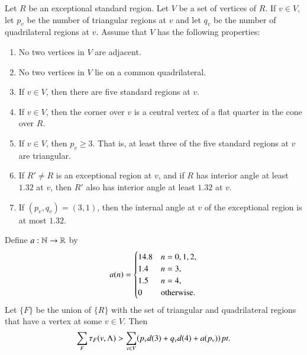 \begin{lemma}\label{lemma:excess-1}
Let $R$ be an exceptional standard region.  Let $V$
be a set of vertices of $R$.  If $v\in V$, let $p_v$ be the number
of triangular regions at $v$ and let $q_v$ be the number of
quadrilateral regions at $v$.  Assume that $V$ has the following
properties:
    \begin{enumerate}
        \item No two
        vertices in $V$ are adjacent.
        \item No two vertices
        in $V$ lie on a common quadrilateral.
        \item If $v\in V$, then there are five standard regions at
        $v$.
        \item If $v\in V$, then the corner over $v$ is a central
        vertex of a flat quarter in the cone over $R$.
        \item If $v\in V$, then $p_v\ge 3$.  That is, at least
        three of the five standard regions at $v$ are triangular.
        \item If $R'\ne R$ is an exceptional region at $v$, and if $R$
        has interior angle at least $1.32$ at $v$, then $R'$ also has interior
        angle at least $1.32$ at $v$.
        \item If $(p_v,q_v)=(3,1)$, then the internal angle at $v$ of the exceptional
        region is at most $1.32$.
    \end{enumerate}
  Define $a:{\mathbb N}\to {\mathbb R}$ by
  $$a(n) = \begin{cases}
    14.8 &n=0,1,2,\\
    1.4 & n=3,\\
    1.5 & n=4,\\
    0 & \text{otherwise.}
  \end{cases}
  \index{aZ@$a(n)$}
  $$
Let $\{F\}$ be the union of $\{R\}$ with the set of triangular and
quadrilateral regions that have a vertex at some $v\in V$. Then
    $$\sum_F\tau_F(v,\Lambda) > \sum_{v\in V} (p_v d(3) + q_v d(4) + a
    (p_v))\,\hbox{\it pt}.$$
\end{lemma}


